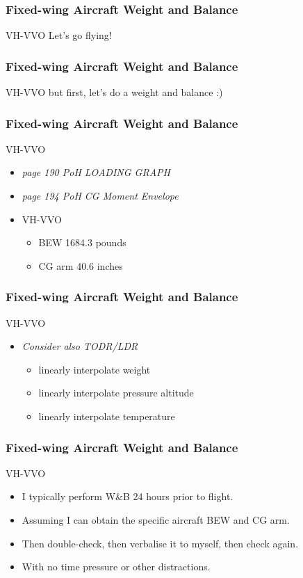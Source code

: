 \begin{frame}
\frametitle{Fixed-wing Aircraft Weight and Balance}
\begin{block}{VH-VVO}
Let's go flying!
\end{block}
\end{frame}

\begin{frame}
\frametitle{Fixed-wing Aircraft Weight and Balance}
\begin{block}{VH-VVO}
but first, let's do a weight and balance :)
\end{block}
\end{frame}

\begin{frame}
\frametitle{Fixed-wing Aircraft Weight and Balance}
\begin{block}{VH-VVO}
\begin{itemize}
\item \tiny{\emph{page 190 PoH LOADING GRAPH}}
\item \tiny{\emph{page 194 PoH CG Moment Envelope}}
\item \tiny{VH-VVO}
  \begin{itemize}
  \item \tiny{BEW 1684.3 pounds}
  \item \tiny{CG arm 40.6 inches}
  \end{itemize}
\end{itemize}
\end{block}
\end{frame}

\begin{frame}
\frametitle{Fixed-wing Aircraft Weight and Balance}
\begin{block}{VH-VVO}
\begin{itemize}
\item \tiny{\emph{Consider also TODR/LDR}}
  \begin{itemize}
  \item \tiny{linearly interpolate weight}
  \item \tiny{linearly interpolate pressure altitude}
  \item \tiny{linearly interpolate temperature}
  \end{itemize}
\end{itemize}
\end{block}
\end{frame}

\begin{frame}
\frametitle{Fixed-wing Aircraft Weight and Balance}
\begin{block}{VH-VVO}
\begin{itemize}
\item<1-> I typically perform W\&B 24 hours prior to flight.
\item<2-> Assuming I can obtain the specific aircraft BEW and CG arm.
\item<3-> Then double-check, then verbalise it to myself, then check again.
\item<4-> With no time pressure or other distractions.
\end{itemize}
\end{block}
\end{frame}

